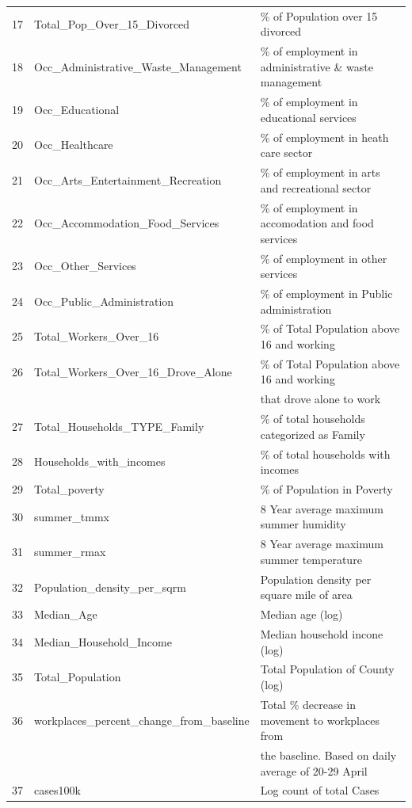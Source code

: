 \documentclass[
]{article}
\begin{document}
\begin{table}[ht]
{\begin{tabular}{rll}
  17 & Total\_Pop\_Over\_15\_Divorced & \% of Population over 15 divorced \\ 
  18 & Occ\_Administrative\_Waste\_Management & \% of employment in administrative \& waste management \\ 
  19 & Occ\_Educational & \% of employment in educational services \\ 
  20 & Occ\_Healthcare & \% of employment in heath care sector \\ 
  21 & Occ\_Arts\_Entertainment\_Recreation & \% of employment in arts and recreational sector \\ 
  22 & Occ\_Accommodation\_Food\_Services & \% of employment in accomodation and food services \\ 
  23 & Occ\_Other\_Services & \% of employment in other services \\ 
  24 & Occ\_Public\_Administration & \% of employment in Public administration \\ 
  25 & Total\_Workers\_Over\_16 & \% of Total Population above 16 and working \\ 
  26 & Total\_Workers\_Over\_16\_Drove\_Alone & \% of Total Population above 16 and working \\
& &  that drove alone to work \\ 
  27 & Total\_Households\_TYPE\_Family & \% of total households categorized as Family \\ 
  28 & Households\_with\_incomes & \% of total households with incomes \\ 
  29 & Total\_poverty & \% of Population in Poverty \\ 
  30 & summer\_tmmx & 8 Year average maximum summer humidity \\ 
  31 & summer\_rmax & 8 Year average maximum summer temperature \\ 
  32 & Population\_density\_per\_sqrm & Population density per square mile of area \\ 
  33 & Median\_Age & Median age (log) \\ 
  34 & Median\_Household\_Income & Median household incone (log) \\ 
  35 & Total\_Population & Total Population of County (log) \\ 
  36 & workplaces\_percent\_change\_from\_baseline & Total \% decrease in movement to workplaces from \\
& &  the baseline. Based on daily average of 20-29 April  \\ 
  37 & cases100k & Log count of total Cases \\ 
   \hline
\end{tabular}}
\end{table}
\end{document}
